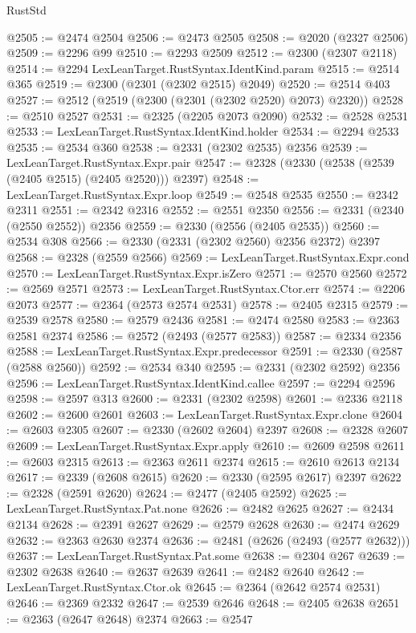 \begin{lexlean}{RustStd}
\begin{coremodule}
@2505 := @2474 @2504
@2506 := @2473 @2505
@2508 := @2020 (@2327 @2506)
@2509 := @2296 @99
@2510 := @2293 @2509
@2512 := @2300 (@2307 @2118)
@2514 := @2294 LexLeanTarget.RustSyntax.IdentKind.param
@2515 := @2514 @365
@2519 := @2300 (@2301 (@2302 @2515) @2049)
@2520 := @2514 @403
@2527 := @2512 (@2519 (@2300 (@2301 (@2302 @2520) @2073) @2320))
@2528 := @2510 @2527
@2531 := @2325 (@2205 @2073 @2090)
@2532 := @2528 @2531
@2533 := LexLeanTarget.RustSyntax.IdentKind.holder
@2534 := @2294 @2533
@2535 := @2534 @360
@2538 := @2331 (@2302 @2535) @2356
@2539 := LexLeanTarget.RustSyntax.Expr.pair
@2547 := @2328 (@2330 (@2538 (@2539 (@2405 @2515) (@2405 @2520))) @2397)
@2548 := LexLeanTarget.RustSyntax.Expr.loop
@2549 := @2548 @2535
@2550 := @2342 @2311
@2551 := @2342 @2316
@2552 := @2551 @2350
@2556 := @2331 (@2340 (@2550 @2552)) @2356
@2559 := @2330 (@2556 (@2405 @2535))
@2560 := @2534 @308
@2566 := @2330 (@2331 (@2302 @2560) @2356 @2372) @2397
@2568 := @2328 (@2559 @2566)
@2569 := LexLeanTarget.RustSyntax.Expr.cond
@2570 := LexLeanTarget.RustSyntax.Expr.isZero
@2571 := @2570 @2560
@2572 := @2569 @2571
@2573 := LexLeanTarget.RustSyntax.Ctor.err
@2574 := @2206 @2073
@2577 := @2364 (@2573 @2574 @2531)
@2578 := @2405 @2315
@2579 := @2539 @2578
@2580 := @2579 @2436
@2581 := @2474 @2580
@2583 := @2363 @2581 @2374
@2586 := @2572 (@2493 (@2577 @2583))
@2587 := @2334 @2356
@2588 := LexLeanTarget.RustSyntax.Expr.predecessor
@2591 := @2330 (@2587 (@2588 @2560))
@2592 := @2534 @340
@2595 := @2331 (@2302 @2592) @2356
@2596 := LexLeanTarget.RustSyntax.IdentKind.callee
@2597 := @2294 @2596
@2598 := @2597 @313
@2600 := @2331 (@2302 @2598)
@2601 := @2336 @2118
@2602 := @2600 @2601
@2603 := LexLeanTarget.RustSyntax.Expr.clone
@2604 := @2603 @2305
@2607 := @2330 (@2602 @2604) @2397
@2608 := @2328 @2607
@2609 := LexLeanTarget.RustSyntax.Expr.apply
@2610 := @2609 @2598
@2611 := @2603 @2315
@2613 := @2363 @2611 @2374
@2615 := @2610 @2613 @2134
@2617 := @2339 (@2608 @2615)
@2620 := @2330 (@2595 @2617) @2397
@2622 := @2328 (@2591 @2620)
@2624 := @2477 (@2405 @2592)
@2625 := LexLeanTarget.RustSyntax.Pat.none
@2626 := @2482 @2625
@2627 := @2434 @2134
@2628 := @2391 @2627
@2629 := @2579 @2628
@2630 := @2474 @2629
@2632 := @2363 @2630 @2374
@2636 := @2481 (@2626 (@2493 (@2577 @2632)))
@2637 := LexLeanTarget.RustSyntax.Pat.some
@2638 := @2304 @267
@2639 := @2302 @2638
@2640 := @2637 @2639
@2641 := @2482 @2640
@2642 := LexLeanTarget.RustSyntax.Ctor.ok
@2645 := @2364 (@2642 @2574 @2531)
@2646 := @2369 @2332
@2647 := @2539 @2646
@2648 := @2405 @2638
@2651 := @2363 (@2647 @2648) @2374
@2663 := @2547

\end{coremodule}
\end{lexlean}
